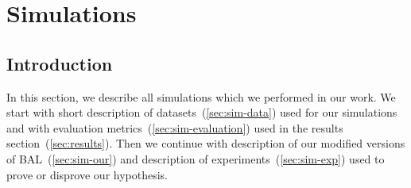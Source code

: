 
\section{Simulations}
\label{sec:simulations} 

\subsection*{Introduction} 
In this section, we describe all simulations which we performed in our work. We start with short description of datasets~(\ref{sec:sim-data}) used for our simulations and with evaluation metrics~(\ref{sec:sim-evaluation}) used in the results section~(\ref{sec:results}). Then we continue with description of our modified versions of BAL~(\ref{sec:sim-our}) and description of experiments~(\ref{sec:sim-exp}) used to prove or disprove our hypothesis. 



 

 

 
